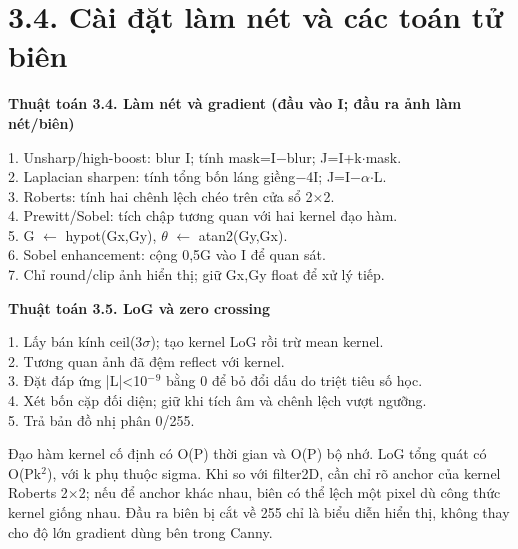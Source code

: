 \documentclass[12pt,a4paper]{extreport}
\begin{document}
\section*{3.4. Cài đặt làm nét và các toán tử biên}
\textbf{Thuật toán 3.4. Làm nét và gradient (đầu vào I; đầu ra ảnh làm nét/\allowbreak{}biên)}\par{\fontsize{10.5}{12}\selectfont\begin{flushleft}
1. Unsharp/\allowbreak{}high-boost: blur I; tính mask=\allowbreak{}I\ensuremath{-}blur; J=\allowbreak{}I+\allowbreak{}k\ensuremath{\cdot}mask.\\
2. Laplacian sharpen: tính tổng bốn láng giềng\ensuremath{-}4I; J=\allowbreak{}I\ensuremath{-}\ensuremath{\alpha}\ensuremath{\cdot}L.\\
3. Roberts: tính hai chênh lệch chéo trên cửa sổ 2\ensuremath{\times}2.\\
4. Prewitt/\allowbreak{}Sobel: tích chập tương quan với hai kernel đạo hàm.\\
5. G \ensuremath{\leftarrow} hypot(Gx,\allowbreak{}Gy),\allowbreak{} \ensuremath{\theta} \ensuremath{\leftarrow} atan2(Gy,\allowbreak{}Gx).\\
6. Sobel enhancement: cộng 0,\allowbreak{}5G vào I để quan sát.\\
7. Chỉ round/\allowbreak{}clip ảnh hiển thị; giữ Gx,\allowbreak{}Gy float để xử lý tiếp.\\
\end{flushleft}}
\textbf{Thuật toán 3.5. LoG và zero crossing}\par{\fontsize{10.5}{12}\selectfont\begin{flushleft}
1. Lấy bán kính ceil(3\ensuremath{\sigma}); tạo kernel LoG rồi trừ mean kernel.\\
2. Tương quan ảnh đã đệm reflect với kernel.\\
3. Đặt đáp ứng |L|<10\ensuremath{{}^-}\ensuremath{{}^9} bằng 0 để bỏ đổi dấu do triệt tiêu số học.\\
4. Xét bốn cặp đối diện; giữ khi tích âm và chênh lệch vượt ngưỡng.\\
5. Trả bản đồ nhị phân 0/\allowbreak{}255.\\
\end{flushleft}}
Đạo hàm kernel cố định có O(P) thời gian và O(P) bộ nhớ. LoG tổng quát có O(Pk\ensuremath{{}^2}),\allowbreak{} với k phụ thuộc sigma. Khi so với filter2D,\allowbreak{} cần chỉ rõ anchor của kernel Roberts 2\ensuremath{\times}2; nếu để anchor khác nhau,\allowbreak{} biên có thể lệch một pixel dù công thức kernel giống nhau. Đầu ra biên bị cắt về 255 chỉ là biểu diễn hiển thị,\allowbreak{} không thay cho độ lớn gradient dùng bên trong Canny.
\par
\end{document}
